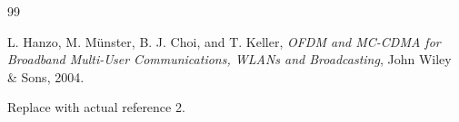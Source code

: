 \documentclass{article}
\begin{document}


\tableofcontents
\thispagestyle{empty}
\clearpage



{\let\oldnumberline\numberline
\renewcommand{\numberline}{Figure~\oldnumberline}
\listoffigures}
{}
\clearpage

{\let\oldnumberline\numberline
\renewcommand{\numberline}{Table~\oldnumberline}
\listoftables}
{}
\clearpage





\clearpage


\clearpage


\clearpage


\clearpage

{}

\begin{thebibliography}{99}

L. Hanzo, M. Münster, B. J. Choi, and T. Keller,
\textit{OFDM and MC-CDMA for Broadband Multi-User Communications, WLANs and Broadcasting},
John Wiley \& Sons, 2004.

Replace with actual reference 2.

\end{thebibliography}
\end{document}
